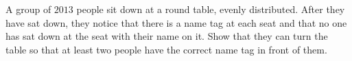 A group of $2013$ people sit down at a round table, evenly distributed.
After they have sat down, they notice that there is a name tag at each seat and that no
one has sat down at the seat with their name on it. Show that they can turn the table so that
at least two people have the correct name tag in front of them.